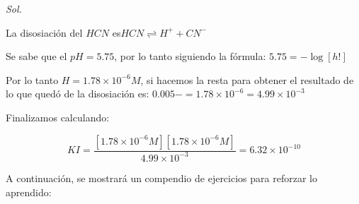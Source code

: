 
\textit{ Sol. }

La disosiación del $HCN$ es$HCN \rightleftharpoons H^+ + CN^-$

Se sabe que el $pH=5.75$, por lo tanto siguiendo la fórmula: $5.75=-\log[h!]$

Por lo tanto $H=1.78\times 10^{-6}M$, si hacemos la resta para obtener el resultado de lo que quedó de la disosiación es: $0.005-=1.78\times 10^{-6}=4.99\times 10^{-3}$

Finalizamos calculando:

\begin{equation*}
	KI=\frac{[1.78\times 10^{-6}M][1.78\times 10^{-6}M]}{4.99\times 10^{-3}}=6.32\times 10^{-10}
\end{equation*}


A continuación, se mostrará un compendio de ejercicios para reforzar lo aprendido:


